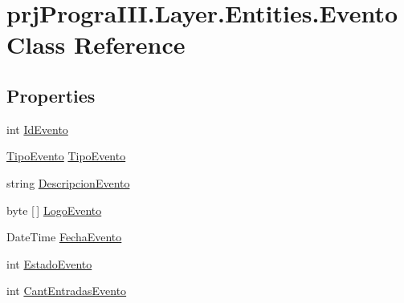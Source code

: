 \hypertarget{classprj_progra_i_i_i_1_1_layer_1_1_entities_1_1_evento}{}\section{prj\+Progra\+I\+I\+I.\+Layer.\+Entities.\+Evento Class Reference}
\label{classprj_progra_i_i_i_1_1_layer_1_1_entities_1_1_evento}
\subsection*{Properties}
\begin{DoxyCompactItemize}
\item 
int \hyperlink{classprj_progra_i_i_i_1_1_layer_1_1_entities_1_1_evento_a52a15e1b9a5888b7d5c3b38a8d988d8e}{Id\+Evento}
\item 
\hyperlink{classprj_progra_i_i_i_1_1_layer_1_1_entities_1_1_tipo_evento}{Tipo\+Evento} \hyperlink{classprj_progra_i_i_i_1_1_layer_1_1_entities_1_1_evento_a961e8669e6bec7b661dc89930bd393bf}{Tipo\+Evento}
\item 
string \hyperlink{classprj_progra_i_i_i_1_1_layer_1_1_entities_1_1_evento_a28dfb8803be867ba5df6d43fc668bc99}{Descripcion\+Evento}
\item 
byte \mbox{[}$\,$\mbox{]} \hyperlink{classprj_progra_i_i_i_1_1_layer_1_1_entities_1_1_evento_a05a4b78092cc7e2b55e526addc05217f}{Logo\+Evento}
\item 
Date\+Time \hyperlink{classprj_progra_i_i_i_1_1_layer_1_1_entities_1_1_evento_ae9842ee168f4ed2220ec08bd60d41af5}{Fecha\+Evento}
\item 
int \hyperlink{classprj_progra_i_i_i_1_1_layer_1_1_entities_1_1_evento_a746ec9ebafa77ce6d3699f765b0e19a3}{Estado\+Evento}
\item 
int \hyperlink{classprj_progra_i_i_i_1_1_layer_1_1_entities_1_1_evento_ab043e4dbaadd5c8de1f6f4f699840ba7}{Cant\+Entradas\+Evento}

\end{DoxyCompactItemize}
